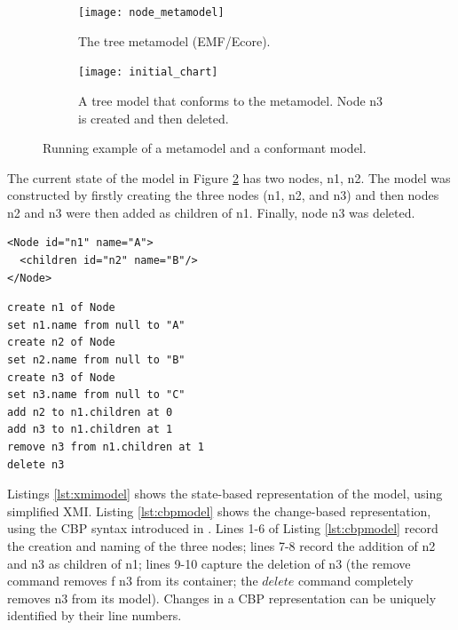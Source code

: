 \begin{figure}[ht]
\begin{subfigure}[t]{0.29\linewidth}
\centering
\texttt{[image: node\_metamodel]}
\caption{The tree metamodel (EMF/Ecore).}
\label{fig:tree_metamodel}
\end{subfigure}
\hfill
\begin{subfigure}[h]{0.69\linewidth}
\centering
\texttt{[image: initial\_chart]}
\caption{A tree model that conforms to the  metamodel.  Node n3 is created and then deleted.}
\label{fig:initial_model}
\end{subfigure}
\caption{Running example of a metamodel and a conformant model.}
\label{fig:append_speed}
\end{figure}

The current state of the model in Figure \ref{fig:initial_model} has two nodes, \textsf{n1}, \textsf{n2}.  The model was constructed by firstly creating the three nodes (\textsf{n1}, \textsf{n2}, and \textsf{n3}) and then nodes \textsf{n2} and \textsf{n3} were then added as children of \textsf{n1}. Finally, node \textsf{n3} was deleted.

\vspace{-20pt}
\begin{minipage}[t]{0.5\linewidth}
\begin{lstlisting}[style=xmi,caption={State-based tree model.},label=lst:xmimodel]
<Node id="n1" name="A">
  <children id="n2" name="B"/>
</Node>
\end{lstlisting}
\end{minipage}
\hfill
\begin{minipage}[t]{0.5\linewidth}
\begin{lstlisting}[style=eol,caption={Change-based tree model.},label=lst:cbpmodel]
create n1 of Node
set n1.name from null to "A"  
create n2 of Node
set n2.name from null to "B"  
create n3 of Node
set n3.name from null to "C"  
add n2 to n1.children at 0  
add n3 to n1.children at 1
remove n3 from n1.children at 1
delete n3
\end{lstlisting}
\end{minipage}

Listings \ref{lst:xmimodel} shows the state-based representation of the model, using simplified XMI. Listing \ref{lst:cbpmodel} shows the change-based representation, using the CBP syntax introduced in \cite{yohannis2017turning}. Lines 1-6 of Listing \ref{lst:cbpmodel} record the creation and naming of the three nodes; lines 7-8 record the addition of \textsf{n2} and \textsf{n3} as children of \textsf{n1}; lines 9-10 capture the deletion of \textsf{n3} (the \textsf{remove} command removes f \textsf{n3} from its container; the $delete$ command completely removes \textsf{n3} from its model). Changes in a CBP representation can be uniquely identified by their line numbers.

